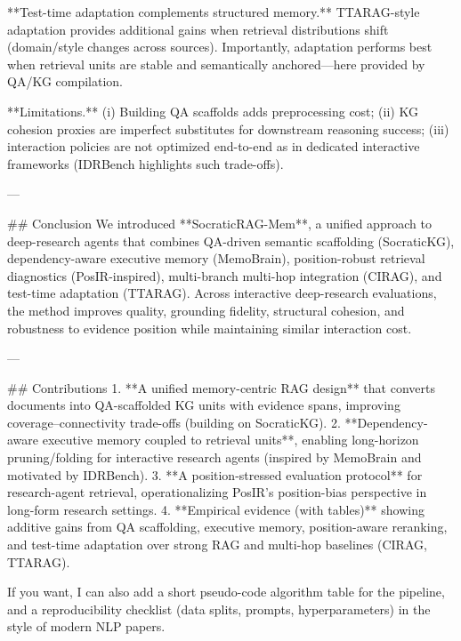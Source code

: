 **Test-time adaptation complements structured memory.** TTARAG-style adaptation provides additional gains when retrieval distributions shift (domain/style changes across sources). Importantly, adaptation performs best when retrieval units are stable and semantically anchored—here provided by QA/KG compilation.

**Limitations.** (i) Building QA scaffolds adds preprocessing cost; (ii) KG cohesion proxies are imperfect substitutes for downstream reasoning success; (iii) interaction policies are not optimized end-to-end as in dedicated interactive frameworks (IDRBench highlights such trade-offs).

---

## Conclusion  
We introduced **SocraticRAG-Mem**, a unified approach to deep-research agents that combines QA-driven semantic scaffolding (SocraticKG), dependency-aware executive memory (MemoBrain), position-robust retrieval diagnostics (PosIR-inspired), multi-branch multi-hop integration (CIRAG), and test-time adaptation (TTARAG). Across interactive deep-research evaluations, the method improves quality, grounding fidelity, structural cohesion, and robustness to evidence position while maintaining similar interaction cost.

---

## Contributions  
1. **A unified memory-centric RAG design** that converts documents into QA-scaffolded KG units with evidence spans, improving coverage–connectivity trade-offs (building on SocraticKG).  
2. **Dependency-aware executive memory coupled to retrieval units**, enabling long-horizon pruning/folding for interactive research agents (inspired by MemoBrain and motivated by IDRBench).  
3. **A position-stressed evaluation protocol** for research-agent retrieval, operationalizing PosIR’s position-bias perspective in long-form research settings.  
4. **Empirical evidence (with tables)** showing additive gains from QA scaffolding, executive memory, position-aware reranking, and test-time adaptation over strong RAG and multi-hop baselines (CIRAG, TTARAG).

If you want, I can also add a short pseudo-code algorithm table for the pipeline, and a reproducibility checklist (data splits, prompts, hyperparameters) in the style of modern NLP papers.